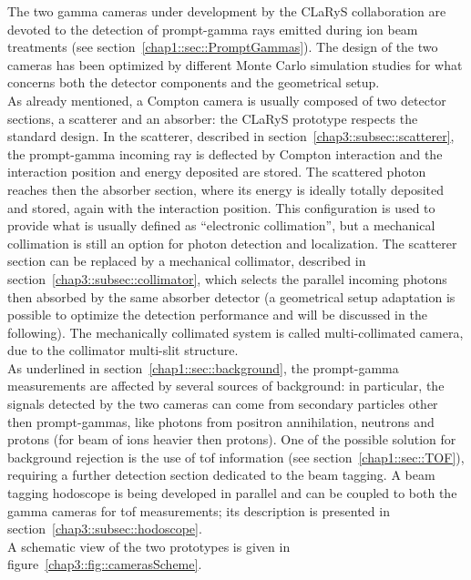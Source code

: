 The two gamma cameras under development by the CLaRyS collaboration are devoted to the detection of prompt-gamma rays emitted during ion beam treatments (see section~\ref{chap1::sec::PromptGammas}). The design of the two cameras has been optimized by different Monte Carlo simulation studies for what concerns both the detector components and the geometrical setup.\\
As already mentioned, a Compton camera is usually composed of two detector sections, a scatterer and an absorber: the CLaRyS prototype respects the standard design. In the scatterer, described in section~\ref{chap3::subsec::scatterer}, the prompt-gamma incoming ray is deflected by Compton interaction and the interaction position and energy deposited are stored. The scattered photon reaches then the absorber section, where its energy is ideally totally deposited and stored, again with the interaction position. This configuration is used to provide what is usually defined as \enquote{electronic collimation}, but a mechanical collimation is still an option for photon detection and localization. The scatterer section can be replaced by a mechanical collimator, described in section~\ref{chap3::subsec::collimator}, which selects the parallel incoming photons then absorbed by the same absorber detector (a geometrical setup adaptation is possible to optimize the detection performance and will be discussed in the following). The mechanically collimated system is called multi-collimated camera, due to the collimator multi-slit structure.\\ 
As underlined in section~\ref{chap1::sec::background}, the prompt-gamma measurements are affected by several sources of background: in particular, the signals detected by the two cameras can come from secondary particles other then prompt-gammas, like photons from positron annihilation, neutrons and protons (for beam of ions heavier then protons). One of the possible solution for background rejection is the use of \gls{tof} information (see section~\ref{chap1::sec::TOF}), requiring a further detection section dedicated to the beam tagging. A beam tagging hodoscope is being developed in parallel and can be coupled to both the gamma cameras for \gls{tof} measurements; its description is presented in section~\ref{chap3::subsec::hodoscope}.\\
A schematic view of the two prototypes is given in figure~\ref{chap3::fig::camerasScheme}.\\

